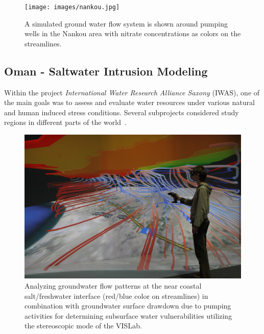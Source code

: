 \documentclass[twocolumn]{svjour3}          %
\begin{document}
\begin{figure}[htb]
  \texttt{[image: images/nankou.jpg]}
\caption{A simulated ground water flow system is shown around pumping wells in the Nankou area with nitrate concentrations as colors on the streamlines.}
\label{fig:nankou}
\end{figure}

\subsection{Oman - Saltwater Intrusion Modeling}
\label{oman---saltwater-intrusion}

Within the project \emph{International Water Research Alliance Saxony} (IWAS), one of the main goals was to assess and evaluate water resources under various natural and human induced stress conditions. Several subprojects considered study regions in different parts of the world~\cite{kalbus:ees}.

\begin{figure}[htb]
  \includegraphics[width=\linewidth]{images/oman.jpg}
\caption{Analyzing groundwater flow patterns at the near coastal salt/freshwater interface (red/blue color on streamlines) in combination with groundwater surface drawdown due to pumping activities for determining subsurface water vulnerabilities utilizing the stereoscopic mode of the VISLab.}
\label{fig:oman}
\end{figure}
\end{document}
